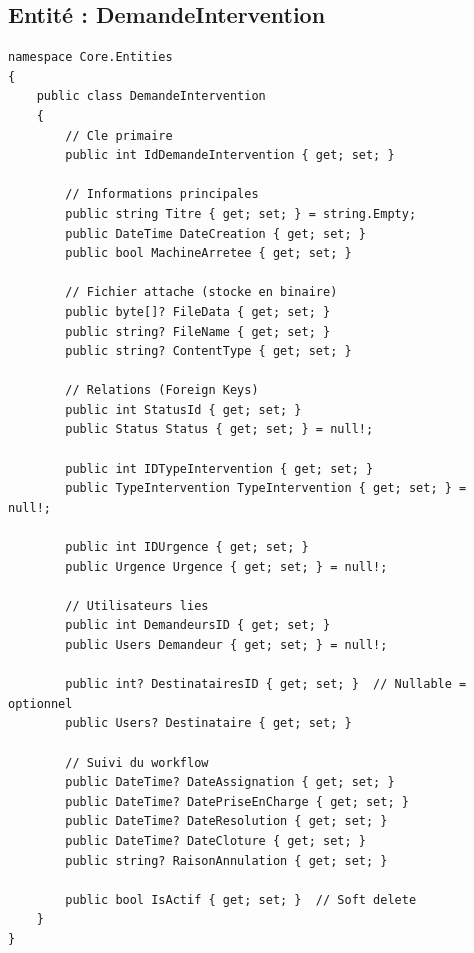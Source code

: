 \documentclass[12pt,a4paper]{article}
\begin{document}
\subsection{Entité : DemandeIntervention}

\begin{lstlisting}[language=CSharp, caption=Core/Entities/interventions/DemandeIntervention.cs]
namespace Core.Entities
{
    public class DemandeIntervention
    {
        // Cle primaire
        public int IdDemandeIntervention { get; set; }
        
        // Informations principales
        public string Titre { get; set; } = string.Empty;
        public DateTime DateCreation { get; set; }
        public bool MachineArretee { get; set; }
        
        // Fichier attache (stocke en binaire)
        public byte[]? FileData { get; set; }
        public string? FileName { get; set; }
        public string? ContentType { get; set; }

        // Relations (Foreign Keys)
        public int StatusId { get; set; }
        public Status Status { get; set; } = null!;
        
        public int IDTypeIntervention { get; set; }
        public TypeIntervention TypeIntervention { get; set; } = null!;
        
        public int IDUrgence { get; set; }
        public Urgence Urgence { get; set; } = null!;
        
        // Utilisateurs lies
        public int DemandeursID { get; set; }
        public Users Demandeur { get; set; } = null!;
        
        public int? DestinatairesID { get; set; }  // Nullable = optionnel
        public Users? Destinataire { get; set; }
        
        // Suivi du workflow
        public DateTime? DateAssignation { get; set; }
        public DateTime? DatePriseEnCharge { get; set; }
        public DateTime? DateResolution { get; set; }
        public DateTime? DateCloture { get; set; }
        public string? RaisonAnnulation { get; set; }
        
        public bool IsActif { get; set; }  // Soft delete
    }
}
\end{lstlisting}
\end{document}
